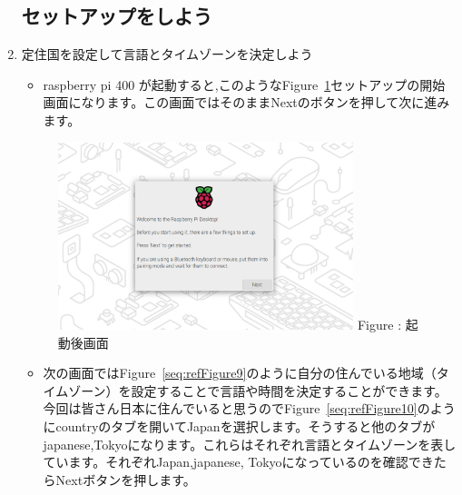 \documentclass[a4paper,12pt]{jarticle}
\begin{document}
\begin{enumerate}

  \subsection{セットアップをしよう}
  \item 定住国を設定して言語とタイムゾーンを決定しよう
        \begin{itemize}
          \item
                raspberry pi 400 が起動すると,このようなFigure~\ref{seq:refFigure8}セットアップの開始画面になります。この画面ではそのままNextのボタンを押して次に進みます。
        \end{itemize} 
        \begin{figure}[h]
          \centering
          \begin{minipage}{5.222cm}
          {\upshape
            \includegraphics[width=8.613cm]{sw_image01.png}
            \newline
            Figure {\theFigure\label{seq:refFigure8}}:
            起動後画面
          }
        \end{minipage}
        \end{figure}

        \begin{itemize}
          \item
              次の画面ではFigure~\ref{seq:refFigure9}のように自分の住んでいる地域（タイムゾーン）を設定することで言語や時間を決定することができます。今回は皆さん日本に住んでいると思うのでFigure~\ref{seq:refFigure10}のようにcountryのタブを開いてJapanを選択します。そうすると他のタブがjapanese,Tokyoになります。これらはそれぞれ言語とタイムゾーンを表しています。それぞれJapan,japanese, Tokyoになっているのを確認できたらNextボタンを押します。
            

\end{itemize}
\end{enumerate}
\end{document}
